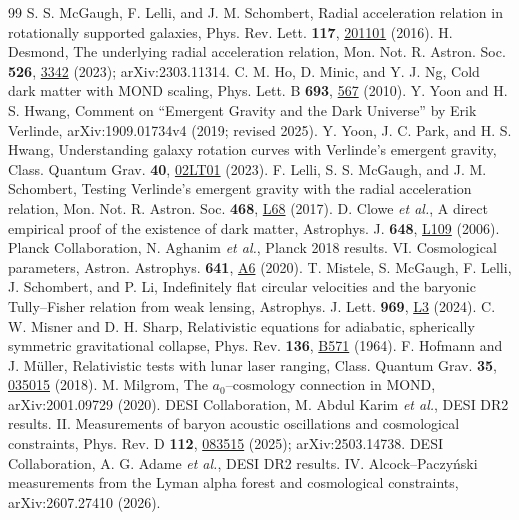 \documentclass[aps,prd,twocolumn,superscriptaddress,nofootinbib,showkeys]{revtex4-2}
\begin{document}
\begin{thebibliography}{99}
 S. S. McGaugh, F. Lelli, and J. M. Schombert, Radial acceleration relation in rotationally supported galaxies, Phys. Rev. Lett. \textbf{117}, \href{https://doi.org/10.1103/PhysRevLett.117.201101}{201101} (2016).
 H. Desmond, The underlying radial acceleration relation, Mon. Not. R. Astron. Soc. \textbf{526}, \href{https://doi.org/10.1093/mnras/stad2762}{3342} (2023); arXiv:2303.11314.
 C. M. Ho, D. Minic, and Y. J. Ng, Cold dark matter with MOND scaling, Phys. Lett. B \textbf{693}, \href{https://doi.org/10.1016/j.physletb.2010.09.008}{567} (2010).
 Y. Yoon and H. S. Hwang, Comment on ``Emergent Gravity and the Dark Universe'' by Erik Verlinde, arXiv:1909.01734v4 (2019; revised 2025).
 Y. Yoon, J. C. Park, and H. S. Hwang, Understanding galaxy rotation curves with Verlinde's emergent gravity, Class. Quantum Grav. \textbf{40}, \href{https://doi.org/10.1088/1361-6382/acaae6}{02LT01} (2023).
 F. Lelli, S. S. McGaugh, and J. M. Schombert, Testing Verlinde's emergent gravity with the radial acceleration relation, Mon. Not. R. Astron. Soc. \textbf{468}, \href{https://doi.org/10.1093/mnrasl/slx031}{L68} (2017).
 D. Clowe \emph{et al.}, A direct empirical proof of the existence of dark matter, Astrophys. J. \textbf{648}, \href{https://doi.org/10.1086/508162}{L109} (2006).
 Planck Collaboration, N. Aghanim \emph{et al.}, Planck 2018 results. VI. Cosmological parameters, Astron. Astrophys. \textbf{641}, \href{https://doi.org/10.1051/0004-6361/201833910}{A6} (2020).
 T. Mistele, S. McGaugh, F. Lelli, J. Schombert, and P. Li, Indefinitely flat circular velocities and the baryonic Tully--Fisher relation from weak lensing, Astrophys. J. Lett. \textbf{969}, \href{https://doi.org/10.3847/2041-8213/ad54b0}{L3} (2024).
 C. W. Misner and D. H. Sharp, Relativistic equations for adiabatic, spherically symmetric gravitational collapse, Phys. Rev. \textbf{136}, \href{https://doi.org/10.1103/PhysRev.136.B571}{B571} (1964).
 F. Hofmann and J. M\"uller, Relativistic tests with lunar laser ranging, Class. Quantum Grav. \textbf{35}, \href{https://doi.org/10.1088/1361-6382/aa8f7a}{035015} (2018).
 M. Milgrom, The $a_0$--cosmology connection in MOND, arXiv:2001.09729 (2020).
 DESI Collaboration, M. Abdul Karim \emph{et al.}, DESI DR2 results. II. Measurements of baryon acoustic oscillations and cosmological constraints, Phys. Rev. D \textbf{112}, \href{https://doi.org/10.1103/tr6y-kpc6}{083515} (2025); arXiv:2503.14738.
 DESI Collaboration, A. G. Adame \emph{et al.}, DESI DR2 results. IV. Alcock--Paczy\'nski measurements from the Lyman alpha forest and cosmological constraints, arXiv:2607.27410 (2026).
\end{thebibliography}
\end{document}
